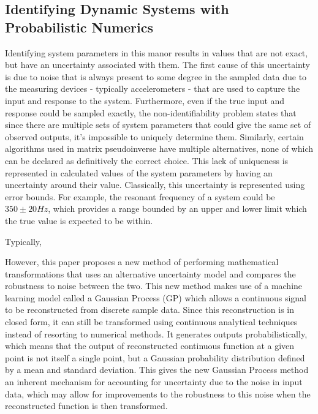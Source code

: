 \documentclass[12pt]{article}
\begin{document}
    \subsection{Identifying Dynamic Systems with Probabilistic Numerics}
    Identifying system parameters in this manor results in values that are not exact, but have an uncertainty associated with them.
    The first cause of this uncertainty is due to noise that is always present to some degree in the sampled data due to the measuring devices - typically accelerometers - that are used to capture the input and response to the system.
    Furthermore, even if the true input and response could be sampled exactly, the non-identifiability problem states that since there are multiple sets of system parameters that could give the same set of observed outputs, it's impossible to uniquely determine them.
    Similarly, certain algorithms used in  matrix pseudoinverse have multiple alternatives, none of which can be declared as definitively the correct choice.
    This lack of uniqueness is represented in calculated values of the system parameters by having an uncertainty around their value.
    Classically, this uncertainty is represented using error bounds.
    For example, the resonant frequency of a system could be $350 \pm 20 Hz$, which provides a range bounded by an upper and lower limit which the true value is expected to be within.

    Typically,

    However, this paper proposes a new method of performing mathematical transformations that uses an alternative uncertainty model and compares the robustness to noise between the two.
    This new method makes use of a machine learning model called a Gaussian Process (GP) which allows a continuous signal to be reconstructed from discrete sample data.
    Since this reconstruction is in closed form, it can still be transformed using continuous analytical techniques instead of resorting to numerical methods.
    It generates outputs probabilistically, which means that the output of reconstructed continuous function at a given point is not itself a single point, but a Gaussian probability distribution defined by a mean and standard deviation.
    This gives the new Gaussian Process method an inherent mechanism for accounting for uncertainty due to the noise in input data, which may allow for improvements to the robustness to this noise when the reconstructed function is then transformed.
\end{document}

